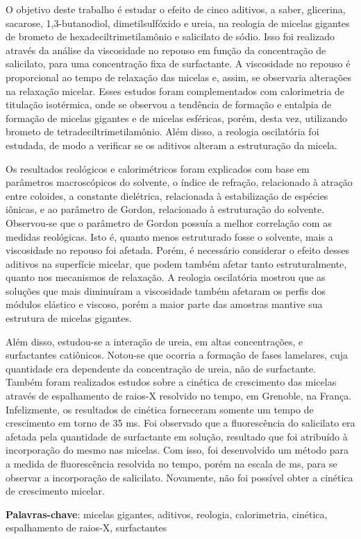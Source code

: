 \documentclass[
	12pt,				%
	openright,			%
	twoside,			%
	a4paper,			%
	english,			%
	brazil%
	]{abntex2}
\begin{document}
\setlength{\absparsep}{18pt} %
\begin{resumo}
 	O objetivo deste trabalho é estudar o efeito de cinco aditivos, a saber, glicerina, sacarose, 1,3-butanodiol, dimetilsulfóxido e ureia, na reologia de micelas gigantes de brometo de hexadeciltrimetilamônio e salicilato de sódio. Isso foi realizado através da análise da viscosidade no repouso em função da concentração de salicilato, para uma concentração fixa de surfactante. A viscosidade no repouso é proporcional ao tempo de relaxação das micelas e, assim, se observaria alterações na relaxação micelar. Esses estudos foram complementados com calorimetria de titulação isotérmica, onde se observou a tendência de formação e entalpia de formação de micelas gigantes e de micelas esféricas, porém, desta vez, utilizando brometo de tetradeciltrimetilamônio. Além disso, a reologia oscilatória foi estudada, de modo a verificar se os aditivos alteram a estruturação da micela.
 	
	Os resultados reológicos e calorimétricos foram explicados com base em parâmetros macroscópicos do solvente, o índice de refração, relacionado à atração entre coloides, a constante dielétrica, relacionada à estabilização de espécies iônicas, e ao parâmetro de Gordon, relacionado à estruturação do solvente. Observou-se que o parâmetro de Gordon possuía a melhor correlação com as medidas reológicas. Isto é, quanto menos estruturado fosse o solvente, mais a viscosidade no repouso foi afetada. Porém, é necessário considerar o efeito desses aditivos na superfície micelar, que podem também afetar tanto estruturalmente, quanto nos mecanismos de relaxação. A reologia oscilatória mostrou que as soluções que mais diminuíram a viscosidade também afetaram os perfis dos módulos elástico e viscoso, porém a maior parte das amostras mantive sua estrutura de micelas gigantes.
	
	Além disso, estudou-se a interação de ureia, em altas concentrações, e surfactantes catiônicos. Notou-se que ocorria a formação de fases lamelares, cuja quantidade era dependente da concentração de ureia, não de surfactante. Também foram realizados estudos sobre a cinética de crescimento das micelas através de espalhamento de raios-X resolvido no tempo, em Grenoble, na França. Infelizmente, os resultados de cinética forneceram somente um tempo de crescimento em torno de 35 ms. Foi observado que a fluorescência do salicilato era afetada pela quantidade de surfactante em solução, resultado que foi atribuído à incorporação do mesmo nas micelas. Com isso, foi desenvolvido um método para a medida de fluorescência resolvida no tempo, porém na escala de ms, para se observar a incorporação de salicilato. Novamente, não foi possível obter a cinética de crescimento micelar.
	
 \textbf{Palavras-chave}: micelas gigantes, aditivos, reologia, calorimetria, cinética, espalhamento de raios-X, surfactantes
\end{resumo}
\end{document}
